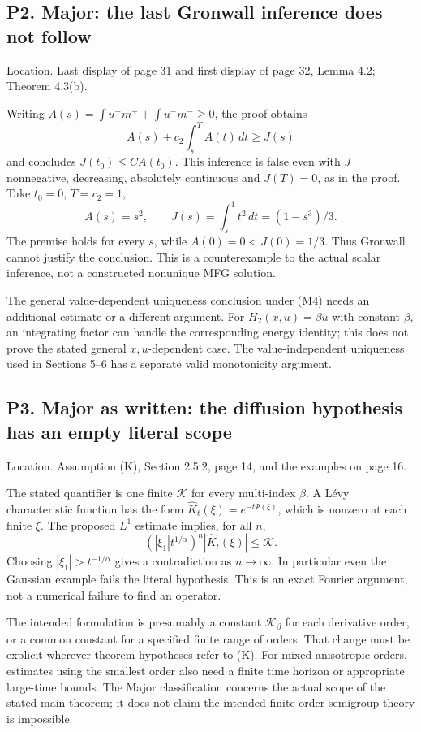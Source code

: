 \documentclass[10pt]{article}
\begin{document}
\subsection*{P2. Major: the last Gronwall inference does not follow}
Location. Last display of page 31 and first display of page 32, Lemma 4.2; Theorem 4.3(b).\par
Writing \(A(s)=\int u^+m^++\int u^-m^-\ge0\), the proof obtains \[A(s)+c_2\int_s^T A(t)\,dt\ge J(s)\] and concludes \(J(t_0)\le C A(t_0)\). This inference is false even with \(J\) nonnegative, decreasing, absolutely continuous and \(J(T)=0\), as in the proof. Take \(t_0=0\), \(T=c_2=1\), \[A(s)=s^2,\qquad J(s)=\int_s^1t^2\,dt=(1-s^3)/3 .\] The premise holds for every \(s\), while \(A(0)=0<J(0)=1/3\). Thus Gronwall cannot justify the conclusion. This is a counterexample to the actual scalar inference, not a constructed nonunique MFG solution.\par
The general value-dependent uniqueness conclusion under (M4) needs an additional estimate or a different argument. For \(H_2(x,u)=\beta u\) with constant \(\beta\), an integrating factor can handle the corresponding energy identity; this does not prove the stated general \(x,u\)-dependent case. The value-independent uniqueness used in Sections 5–6 has a separate valid monotonicity argument.\par
\subsection*{P3. Major as written: the diffusion hypothesis has an empty literal scope}
Location. Assumption (K), Section 2.5.2, page 14, and the examples on page 16.\par
The stated quantifier is one finite \(\mathcal K\) for every multi-index \(\beta\). A Lévy characteristic function has the form \(\widehat K_t(\xi)=e^{-t\Psi(\xi)}\), which is nonzero at each finite \(\xi\). The proposed \(L^1\) estimate implies, for all \(n\), \[(|\xi_1|t^{1/\alpha})^n|\widehat K_t(\xi)|\le\mathcal K .\] Choosing \(|\xi_1|>t^{-1/\alpha}\) gives a contradiction as \(n\to\infty\). In particular even the Gaussian example fails the literal hypothesis. This is an exact Fourier argument, not a numerical failure to find an operator.\par
The intended formulation is presumably a constant \(\mathcal K_\beta\) for each derivative order, or a common constant for a specified finite range of orders. That change must be explicit wherever theorem hypotheses refer to (K). For mixed anisotropic orders, estimates using the smallest order also need a finite time horizon or appropriate large-time bounds. The Major classification concerns the actual scope of the stated main theorem; it does not claim the intended finite-order semigroup theory is impossible.\par
\end{document}
